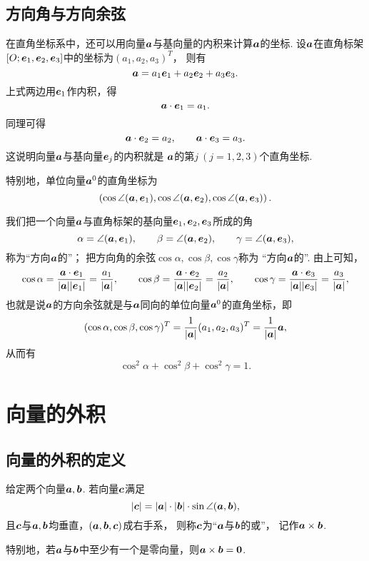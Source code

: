 \subsection{方向角与方向余弦}
在直角坐标系中，还可以用向量\(\boldsymbol{a}\)与基向量的内积来计算\(\boldsymbol{a}\)的坐标.
设\(\boldsymbol{a}\)在直角标架\([O;\boldsymbol{e}_1,\boldsymbol{e}_2,\boldsymbol{e}_3]\)中的坐标为\((a_1,a_2,a_3)^T\)，
则有\[
	\boldsymbol{a}=a_1 \boldsymbol{e}_1 + a_2 \boldsymbol{e}_2 + a_3 \boldsymbol{e}_3.
\]
上式两边用\(\boldsymbol{e}_1\)作内积，得\[
	\boldsymbol{a}\cdot\boldsymbol{e}_1 = a_1.
\]
同理可得\[
	\boldsymbol{a}\cdot\boldsymbol{e}_2 = a_2, \qquad
	\boldsymbol{a}\cdot\boldsymbol{e}_3 = a_3.
\]
这说明向量\(\boldsymbol{a}\)与基向量\(\boldsymbol{e}_j\)的内积就是
\(\boldsymbol{a}\)的第\(j\ (j=1,2,3)\)个直角坐标.

特别地，单位向量\(\boldsymbol{a}^0\)的直角坐标为\[
	\left( \cos\angle(\boldsymbol{a},\boldsymbol{e}_1),
	\cos\angle(\boldsymbol{a},\boldsymbol{e}_2),
	\cos\angle(\boldsymbol{a},\boldsymbol{e}_3) \right).
\]

我们把一个向量\(\boldsymbol{a}\)与直角标架的基向量\(\boldsymbol{e}_1,\boldsymbol{e}_2,\boldsymbol{e}_3\)所成的角\[
	\alpha=\angle(\boldsymbol{a},\boldsymbol{e}_1), \qquad
	\beta=\angle(\boldsymbol{a},\boldsymbol{e}_2), \qquad
	\gamma=\angle(\boldsymbol{a},\boldsymbol{e}_3),
\]称为“方向\(\boldsymbol{a}\)的”；
把方向角的余弦\(\cos\alpha,\cos\beta,\cos\gamma\)称为
“方向\(\boldsymbol{a}\)的”.
由上可知，\[
	\cos\alpha
	= \frac{\boldsymbol{a}\cdot\boldsymbol{e}_1}{\abs{\boldsymbol{a}}\abs{\boldsymbol{e}_1}}
	= \frac{a_1}{\abs{\boldsymbol{a}}},
	\qquad
	\cos\beta
	= \frac{\boldsymbol{a}\cdot\boldsymbol{e}_2}{\abs{\boldsymbol{a}}\abs{\boldsymbol{e}_2}}
	= \frac{a_2}{\abs{\boldsymbol{a}}},
	\qquad
	\cos\gamma
	= \frac{\boldsymbol{a}\cdot\boldsymbol{e}_3}{\abs{\boldsymbol{a}}\abs{\boldsymbol{e}_3}}
	= \frac{a_3}{\abs{\boldsymbol{a}}},
\]
也就是说\(\boldsymbol{a}\)的方向余弦就是与\(\boldsymbol{a}\)同向的单位向量\(\boldsymbol{a}^0\)的直角坐标，即\[
	(\cos\alpha,\cos\beta,\cos\gamma)^T
	= \frac{1}{\abs{\boldsymbol{a}}} (a_1,a_2,a_3)^T
	= \frac{1}{\abs{\boldsymbol{a}}} \boldsymbol{a},
\]
从而有\[
	\cos^2\alpha+\cos^2\beta+\cos^2\gamma=1.
\]

\section{向量的外积}
\subsection{向量的外积的定义}
\begin{definition}
给定两个向量\(\boldsymbol{a},\boldsymbol{b}\).
若向量\(\boldsymbol{c}\)满足
\begin{equation}\label{equation:解析几何.向量外积的长度关系}
	\abs{\boldsymbol{c}}
	= \abs{\boldsymbol{a}} \cdot \abs{\boldsymbol{b}} \cdot \sin\angle(\boldsymbol{a},\boldsymbol{b}),
\end{equation}
且\(\boldsymbol{c}\)与\(\boldsymbol{a},\boldsymbol{b}\)均垂直，\((\boldsymbol{a},\boldsymbol{b},\boldsymbol{c})\)成右手系，
则称\(\boldsymbol{c}\)为“\(\boldsymbol{a}\)与\(\boldsymbol{b}\)的或”，
记作\(\boldsymbol{a}\times\boldsymbol{b}\).

特别地，若\(\boldsymbol{a}\)与\(\boldsymbol{b}\)中至少有一个是零向量，则\(\boldsymbol{a}\times\boldsymbol{b}=\boldsymbol{0}\).
\end{definition}

